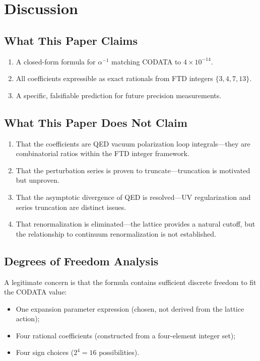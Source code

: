 \documentclass[11pt,twoside]{article}
\theoremstyle{remark}
\newcommand{\inv}{\alpha^{-1}}
\begin{document}
\section{Discussion}
\label{sec:discussion}

\subsection{What This Paper Claims}
\begin{enumerate}[nosep]
    \item A closed-form formula for $\inv$ matching CODATA to $4 \times 10^{-14}$.
    \item All coefficients expressible as exact rationals from FTD integers $\{3, 4, 7, 13\}$.
    \item A specific, falsifiable prediction for future precision measurements.
\end{enumerate}

\subsection{What This Paper Does Not Claim}
\begin{enumerate}[nosep]
    \item That the coefficients are QED vacuum polarization loop integrals---they are combinatorial ratios within the FTD integer framework.
    \item That the perturbation series is proven to truncate---truncation is motivated but unproven.
    \item That the asymptotic divergence of QED is resolved---UV regularization and series truncation are distinct issues.
    \item That renormalization is eliminated---the lattice provides a natural cutoff, but the relationship to continuum renormalization is not established.
\end{enumerate}

\subsection{Degrees of Freedom Analysis}
\label{sec:dof}

A legitimate concern is that the formula contains sufficient discrete freedom to fit the CODATA value:
\begin{itemize}[nosep]
    \item One expansion parameter expression (chosen, not derived from the lattice action);
    \item Four rational coefficients (constructed from a four-element integer set);
    \item Four sign choices ($2^4 = 16$ possibilities).
\end{itemize}
\end{document}
